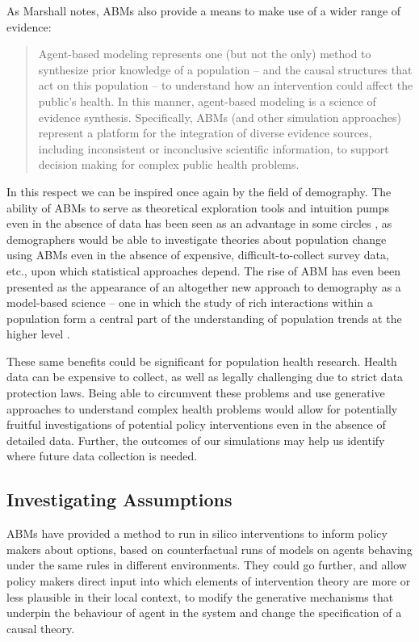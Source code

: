 \documentclass[review]{elsarticle}
\begin{document}
As Marshall notes, ABMs also provide a means to make use of a wider range of evidence: 

\begin{quote}
Agent-based modeling represents one (but not the only) method to synthesize prior knowledge of a population -- and the causal structures that act on this population -- to understand how an intervention could affect the public's health. In this manner, agent-based modeling is a science of evidence synthesis. Specifically, ABMs (and other simulation approaches) represent a platform for the integration of diverse evidence sources, including inconsistent or inconclusive scientific information, to support decision making for complex public health problems. \citep{marshall2017}
\end{quote}

In this respect we can be inspired once again by the field of demography.  The ability of ABMs to serve as theoretical exploration tools and intuition pumps even in the absence of data has been seen as an advantage in some circles \citep{silverman2011}, as demographers would be able to investigate theories about population change using ABMs even in the absence of expensive, difficult-to-collect survey data, etc., upon which statistical approaches depend.  The rise of ABM has even been presented as the appearance of an altogether new approach to demography as a model-based science -- one in which the study of rich interactions within a population form a central part of the understanding of population trends at the higher level \citep{corgeau07, courgeau2017}.

These same benefits could be significant for population health research.  Health data can be expensive to collect, as well as legally challenging due to strict data protection laws.  Being able to circumvent these problems and use generative approaches to understand complex health problems would allow for potentially fruitful investigations of potential policy interventions even in the absence of detailed data.  Further, the outcomes of our simulations may help us identify where future data collection is needed.

\subsection{Investigating Assumptions}

ABMs have provided a method to run in silico interventions to inform policy makers about options, based on counterfactual runs of models on agents behaving under the same rules in different environments. They could go further, and allow policy makers direct input into which elements of intervention theory are more  or less plausible in their local context, to modify the generative mechanisms that underpin the behaviour of agent in the system and change the specification of a causal theory. 
\end{document}
